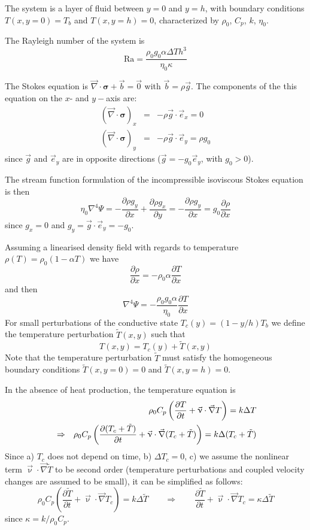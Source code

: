 

The system is a layer of fluid between $y=0$ and $y=h$, with boundary conditions $T(x,y=0)=T_b$ 
and $T(x,y=h)=0$, characterized by $\rho_0$, $C_p$, $k$, $\eta_0$. 

The Rayleigh number of the system is 
\[
\text{Ra}= \frac{\rho_0 g_0 \alpha \Delta T h^3}{\eta_0 \kappa}
\]

The Stokes equation is $\vec \nabla \cdot \bm \sigma + \vec b = \vec 0$ with $\vec b=\rho \vec g$. 
The components of the this equation on the $x$- and $y-$axis are:
\begin{eqnarray}
(\vec \nabla \cdot \bm \sigma)_x &=& - \rho \vec g \cdot \vec e_x = 0\\ 
(\vec \nabla \cdot \bm \sigma)_y &=& - \rho \vec g \cdot \vec e_y = \rho g_0
\end{eqnarray}
since $\vec g$ and $\vec e_y$ are in opposite directions ($\vec g = - g_0 \vec e_y$, with $g_0>0$).

The stream function formulation of the incompressible isoviscous Stokes equation is then
\[
\eta_0 \nabla^4 \Psi
= -\frac{\partial \rho g_y}{\partial x} + \frac{\partial \rho g_x}{\partial y}   
= -\frac{\partial \rho g_y}{\partial x} 
=  g_0 \frac{\partial \rho}{\partial x} 
\]
since $g_x=0$ and $g_y=\vec{g}\cdot\vec{e}_y=-g_0$.

Assuming a linearised density field with regards to temperature $\rho(T)=\rho_0 (1-\alpha T)$
we have 
\[
\frac{\partial \rho}{\partial x} 
=
-\rho_0 \alpha \frac{\partial T}{\partial x} 
\]
and then 
\begin{equation}
\boxed{
\nabla^4 \Psi= -\frac{\rho_0 g_0 \alpha}{\eta_0} \frac{\partial T}{\partial x} 
}
\end{equation}
For small perturbations of the conductive state $T_c(y)=(1-y/h)T_b$ 
we define the temperature perturbation $\tilde{T}(x,y)$ such that 
\[
T(x,y)=T_c(y)+\tilde{T}(x,y)
\]
Note that the temperature perturbation $\tilde{T}$ must satisfy the homogeneous boundary 
conditions $\tilde{T}(x,y=0)=0$ and $\tilde{T}(x,y=h)=0$.

In the absence of heat production, the temperature equation is 
\begin{eqnarray}
&& \rho_0 C_p \left( \frac{\partial T}{\partial t} + {\vec \upnu}\cdot {\vec \nabla} T \right) 
= k \Delta T \nonumber\\
&\Rightarrow&
\rho_0 C_p \left( \frac{\partial (T_c+\tilde{T})}{\partial t} + {\vec \upnu}\cdot {\vec \nabla} 
(T_c+\tilde{T}) \right) 
= k \Delta (T_c+\tilde{T})
\end{eqnarray}
Since a) $T_c$ does not depend on time, b) $\Delta T_c=0$, c) we assume the nonlinear 
term ${\vec \upnu}\cdot {\vec \nabla} \tilde{T} $ to be second order (temperature perturbations and 
coupled velocity changes are assumed to be small), it can be simplified as follows:
\[
\rho_0 C_p \left( \frac{\partial \tilde{T}}{\partial t} + {\vec \upnu}\cdot {\vec \nabla} T_c \right) 
= k \Delta \tilde{T}
\qquad
\Rightarrow
\qquad
\frac{\partial \tilde{T}}{\partial t} + {\vec \upnu}\cdot {\vec \nabla} T_c 
= \kappa \Delta \tilde{T}
\]
since $\kappa =k/\rho_0 C_p$.

